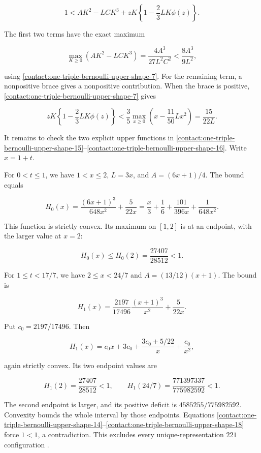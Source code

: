 \[
 1<A K^2-LCK^3
      +zK\left\{1-\frac23 L K\phi(z)\right\}.
\tag{B.10.14}\label{contact:one-triple-bernoulli-upper-shape-14}
\]

The first two terms have the exact maximum

\[
 \max_{K\geq0}(A K^2-LCK^3)
  =\frac{4A^3}{27L^2C^2}
  <\frac{8A^3}{9L^2},
\tag{B.10.15}\label{contact:one-triple-bernoulli-upper-shape-15}
\]

using \eqref{contact:one-triple-bernoulli-upper-shape-7}. For the remaining term, a nonpositive brace gives a
nonpositive contribution. When the brace is positive, \eqref{contact:one-triple-bernoulli-upper-shape-7} gives

\[
 zK\left\{1-\frac23L K\phi(z)\right\}
 <\frac35\max_{x\geq0}
        \left(x-\frac{11}{50}Lx^2\right)
 =\frac{15}{22L}.
\tag{B.10.16}\label{contact:one-triple-bernoulli-upper-shape-16}
\]

It remains to check the two explicit upper functions in
\eqref{contact:one-triple-bernoulli-upper-shape-15}--\eqref{contact:one-triple-bernoulli-upper-shape-16}. Write $x=1+t$.

For $0<t\le 1$, we have $1<x\le 2$, $L=3x$, and $A=(6x+1)/4$.
The bound equals

\[
 H_0(x)=\frac{(6x+1)^3}{648x^2}+\frac5{22x}
 =\frac{x}{3}+\frac16+\frac{101}{396x}+\frac1{648x^2}.
\]

This function is strictly convex. Its maximum on $[1,2]$ is at an
endpoint, with the larger value at $x=2$:

\[
 H_0(x)\leq H_0(2)=\frac{27407}{28512}<1.
\tag{B.10.17}\label{contact:one-triple-bernoulli-upper-shape-17}
\]

For $1\le t<17/7$, we have $2\le x<24/7$ and
$A=(13/12)(x+1)$. The bound is

\[
 H_1(x)=\frac{2197}{17496}\frac{(x+1)^3}{x^2}
                  +\frac5{22x}.
\]

Put $c_0=2197/17496$. Then

\[
 H_1(x)=c_0 x+3c_0+\frac{3c_0+5/22}{x}+\frac{c_0}{x^2},
\]

again strictly convex. Its two endpoint values are

\[
 H_1(2)=\frac{27407}{28512}<1,
 \qquad H_1(24/7)=\frac{771397337}{775982592}<1.
\tag{B.10.18}\label{contact:one-triple-bernoulli-upper-shape-18}
\]

The second endpoint is larger, and its positive deficit is
$4585255/775982592$. Convexity bounds the whole interval by those
endpoints. Equations \eqref{contact:one-triple-bernoulli-upper-shape-14}--\eqref{contact:one-triple-bernoulli-upper-shape-18} force $1<1$, a contradiction. This
excludes every unique-representation $221$ configuration .
